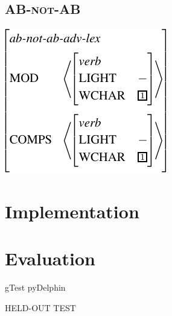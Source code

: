 \documentclass[11pt]{article}
\begin{document}
\subsection{\textsc{AB-not-AB}}
\label{ssec:phrasal}




{\small 
\ex{}
\vspace{-10pt}
\newline
\includegraphics[scale=.8]{pdf/ab.pdf}
\xe}
\vspace{-20pt}


\section{Implementation}
\label{sec:implemetation}


\section{Evaluation}
\label{sec:evaluation}

gTest 
pyDelphin


HELD-OUT
TEST











\end{document}
